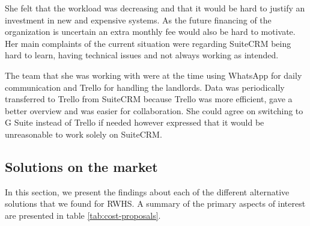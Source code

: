 She felt that the workload was decreasing and that it would be hard to justify an investment in new and expensive systems. As the future financing of the organization is uncertain an extra monthly fee would also be hard to motivate. Her main complaints of the current situation were regarding SuiteCRM being hard to learn, having technical issues and not always working as intended.

The team that she was working with were at the time using WhatsApp for daily communication and Trello for handling the landlords. Data was periodically transferred to Trello from SuiteCRM because Trello was more efficient, gave a better overview and was easier for collaboration. She could agree on switching to G Suite instead of Trello if needed however expressed that it would be unreasonable to work solely on SuiteCRM.



\subsection{Solutions on the market}
In this section, we present the findings about each of the different alternative solutions that we found for RWHS. A summary of the primary aspects of interest are presented in table \ref{tab:cost-proposals}.

